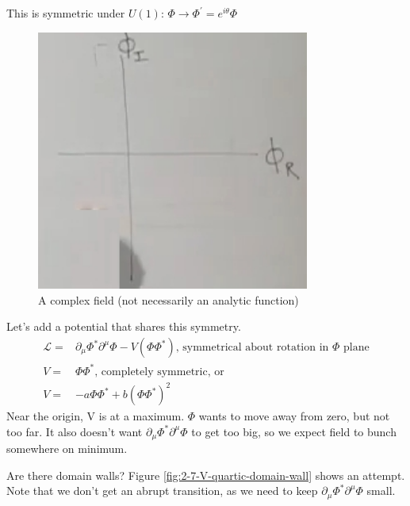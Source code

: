 \documentclass[]{article}
\begin{document}
This is symmetric under $U(1)$: $\Phi \rightarrow \Phi^\prime=e^{i \theta} \Phi$
\begin{figure}[H]
	\caption{A complex field (not necessarily an analytic function)}\label{fig:2-7-complex-phi}
	\includegraphics[width=0.8\textwidth]{2-7-complex-phi}
\end{figure}

Let's add a potential that shares this symmetry.
\begin{align*}
\mathcal{L} =&  \partial_\mu \Phi^* \partial^\mu \Phi -V(\Phi \Phi^*) \text{, symmetrical about rotation in $\Phi$ plane}\\
V =& \Phi \Phi^* \text{, completely symmetric} \text{, or}\\
V=& -a \Phi \Phi^* + b (\Phi \Phi^*)^2
\end{align*}
Near the origin, V is at a maximum. $\Phi$ wants to move away from zero, but not too far. It also doesn't want $\partial_\mu \Phi^* \partial^\mu \Phi$ to get too big, so we expect field to bunch somewhere on minimum.

Are there domain walls? Figure \ref{fig:2-7-V-quartic-domain-wall} shows an attempt. Note that we don't get an abrupt transition, as we need to keep $\partial_\mu \Phi^* \partial^\mu \Phi$ small.
\end{document}
